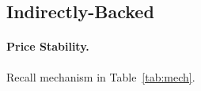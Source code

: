 \subsection{Indirectly-Backed}
\label{sec:dai}

\paragraph{Price Stability.} Recall mechanism in Table~\ref{tab:mech}.

%
%
%
%
